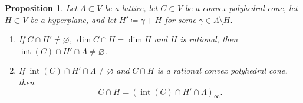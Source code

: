 \documentclass[JEP,XML,SOM,Unicode]{cedram}
\theoremstyle{plain}
\newtheorem{proposition}[theorem]{Proposition}
\theoremstyle{definition}
\DeclareMathOperator{\inter}{int}
\begin{document}
\begin{proposition}
\label{prop.Weights_facet}
Let $\Lambda \subset V$ be a lattice, let $C \subset V$ be a convex polyhedral cone,
let $H \subset V$ be a hyperplane, and let $H' \coloneqq \gamma + H$ for some
$\gamma \in \Lambda \setminus H$.
\begin{enumerate}
\item
\label{prop.Weights_facet1}
If $C \cap H' \neq \varnothing$, $\dim C \cap H = \dim H$ and $H$ is rational, then
$\inter(C) \cap H' \cap \Lambda \neq \varnothing$.
\item
\label{prop.Weights_facet2}
If $\inter(C) \cap H' \cap \Lambda \neq \varnothing$ and
$C \cap H$ is a rational convex polyhedral cone, then
\[
C \cap H = (\inter(C) \cap H' \cap \Lambda)_{\infty}.
\]
\end{enumerate}
\end{proposition}
\end{document}
